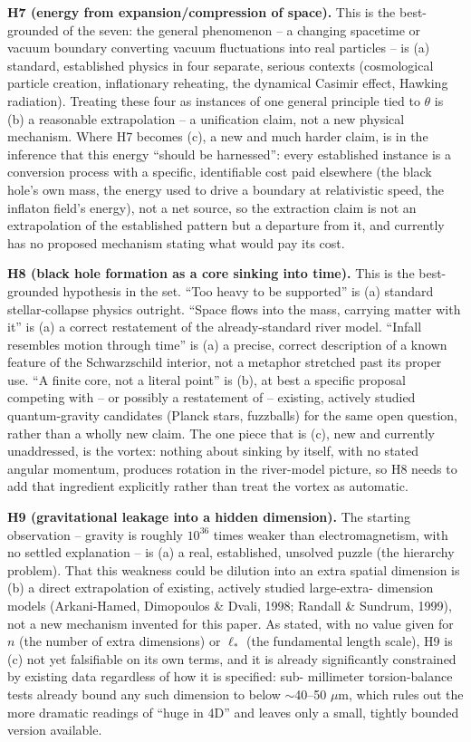\documentclass[12pt, a4paper]{article}
\begin{document}
\textbf{H7 (energy from expansion/compression of space).} This is
the best-grounded of the seven: the general phenomenon -- a changing
spacetime or vacuum boundary converting vacuum fluctuations into real
particles -- is (a) standard, established physics in four separate,
serious contexts (cosmological particle creation, inflationary
reheating, the dynamical Casimir effect, Hawking radiation). Treating
these four as instances of one general principle tied to $\theta$ is
(b) a reasonable extrapolation -- a unification claim, not a new
physical mechanism. Where H7 becomes (c), a new and much harder
claim, is in the inference that this energy ``should be harnessed'':
every established instance is a conversion process with a specific,
identifiable cost paid elsewhere (the black hole's own mass, the
energy used to drive a boundary at relativistic speed, the inflaton
field's energy), not a net source, so the extraction claim is not an
extrapolation of the established pattern but a departure from it,
and currently has no proposed mechanism stating what would pay its
cost.

\textbf{H8 (black hole formation as a core sinking into time).} This
is the best-grounded hypothesis in the set. ``Too heavy to be
supported'' is (a) standard stellar-collapse physics outright. ``Space
flows into the mass, carrying matter with it'' is (a) a correct
restatement of the already-standard river model. ``Infall resembles
motion through time'' is (a) a precise, correct description of a
known feature of the Schwarzschild interior, not a metaphor stretched
past its proper use. ``A finite core, not a literal point'' is (b), at
best a specific proposal competing with -- or possibly a restatement
of -- existing, actively studied quantum-gravity candidates (Planck
stars, fuzzballs) for the same open question, rather than a wholly
new claim. The one piece that is (c), new and currently unaddressed,
is the vortex: nothing about sinking by itself, with no stated
angular momentum, produces rotation in the river-model picture, so
H8 needs to add that ingredient explicitly rather than treat the
vortex as automatic.

\textbf{H9 (gravitational leakage into a hidden dimension).} The
starting observation -- gravity is roughly $10^{36}$ times weaker
than electromagnetism, with no settled explanation -- is (a) a real,
established, unsolved puzzle (the hierarchy problem). That this
weakness could be dilution into an extra spatial dimension is (b) a
direct extrapolation of existing, actively studied large-extra-
dimension models (Arkani-Hamed, Dimopoulos \& Dvali, 1998; Randall \&
Sundrum, 1999), not a new mechanism invented for this paper. As
stated, with no value given for $n$ (the number of extra dimensions)
or $\ell_\ast$ (the fundamental length scale), H9 is (c) not yet
falsifiable on its own terms, and it is already significantly
constrained by existing data regardless of how it is specified: sub-
millimeter torsion-balance tests already bound any such dimension to
below $\sim$40--50 $\mu$m, which rules out the more dramatic readings
of ``huge in 4D'' and leaves only a small, tightly bounded version
available.
\end{document}
